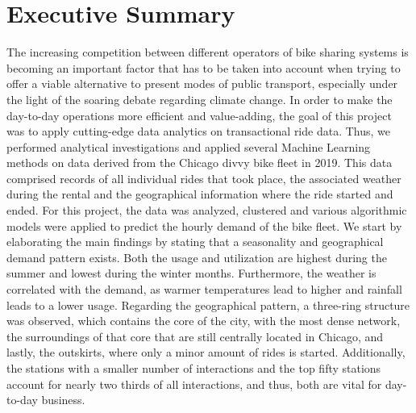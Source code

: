\documentclass[a4paper, 10.5pt]{article}
\begin{document}
\begin{titlepage}

\end{titlepage}

\clearpage
\thispagestyle{empty}
\section*{Executive Summary}

The increasing competition between different operators of bike sharing systems is becoming an important factor that has to be taken into account when trying to offer a viable alternative to present modes of public transport, especially under the light of the soaring debate regarding climate change. In order to make the day-to-day operations more efficient and value-adding, the goal of this project was to apply cutting-edge data analytics on transactional ride data. Thus, we performed analytical investigations and applied several Machine Learning methods on data derived from the Chicago divvy bike fleet in 2019. This data comprised records of all individual rides that took place, the associated weather during the rental and the geographical information where the ride started and ended. For this project, the data was analyzed, clustered and various algorithmic models were applied to predict the hourly demand of the bike fleet.
We start by elaborating the main findings by stating that a seasonality and geographical demand pattern exists. Both the usage and utilization are highest during the summer and lowest during the winter months. Furthermore, the weather is correlated with the demand, as warmer temperatures lead to higher and rainfall leads to a lower usage. Regarding the geographical pattern, a three-ring structure was observed, which contains the core of the city, with the most dense network, the surroundings of that core that are still centrally located in Chicago, and lastly, the outskirts, where only a minor amount of rides is started. Additionally, the stations with a smaller number of interactions and the top fifty stations account for nearly two thirds of all interactions, and thus, both are vital for day-to-day business.
\end{document}
